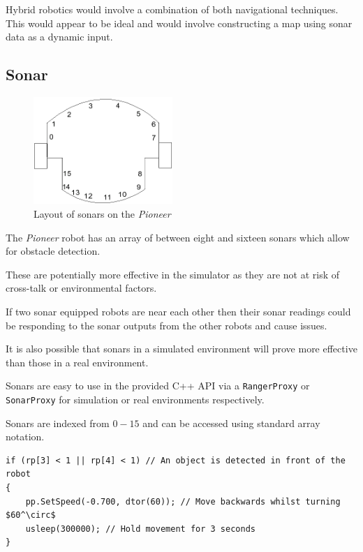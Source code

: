 \documentclass[a4paper,12pt]{article}
\begin{document}
Hybrid robotics would involve a combination of both navigational techniques. This would appear to be ideal and would involve constructing a map using sonar data as a dynamic input.
\subsection{Sonar}
\begin{figure}
    \begin{center}
            \includegraphics[width=0.47\textwidth]{images/sonars_wiki_dcs_aber_ac_uk.png}
            \caption{Layout of sonars on the \textit{Pioneer} \cite{sonardiagram}}
            \end{center}
        \end{figure}

The \textit{Pioneer} robot has an array of between eight and sixteen sonars which allow for obstacle detection.

These are potentially more effective in the simulator as they are not at risk of cross-talk or environmental factors. 

If two sonar equipped robots are near each other then their sonar readings could be responding to the sonar outputs from the other robots and cause issues.

It is also possible that sonars in a simulated environment will prove more effective than those in a real environment.

Sonars are easy to use in the provided C++ API via a \texttt{RangerProxy} or \texttt{SonarProxy} for simulation or real environments respectively. 

Sonars are indexed from $0-15$ and can be accessed using standard array notation.

\begin{lstlisting}
if (rp[3] < 1 || rp[4] < 1) // An object is detected in front of the robot
{
    pp.SetSpeed(-0.700, dtor(60)); // Move backwards whilst turning $60^\circ$
    usleep(300000); // Hold movement for 3 seconds
} 
\end{lstlisting}
\end{document}
